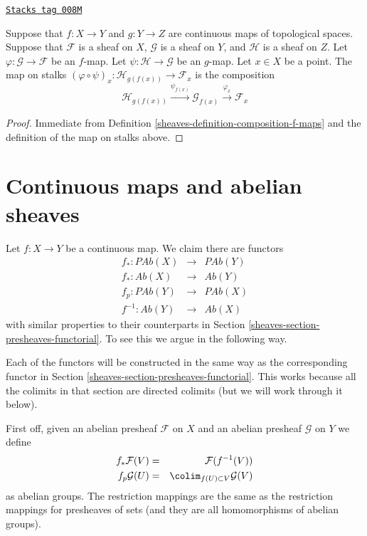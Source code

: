 \begin{lemma}
\label{sheaves-lemma-compose-f-maps-stalks}
\href{https://stacks.math.columbia.edu/tag/008M}{\texttt{Stacks tag 008M}}

Suppose that $f : X \to Y$ and $g : Y \to Z$ are continuous
maps of topological spaces. Suppose that $\mathcal{F}$ is
a sheaf on $X$, $\mathcal{G}$ is a sheaf on $Y$, and
$\mathcal{H}$ is a sheaf on $Z$.
Let $\varphi : \mathcal{G} \to \mathcal{F}$ be an $f$-map.
Let $\psi : \mathcal{H} \to \mathcal{G}$ be an $g$-map.
Let $x \in X$ be a point. The map on stalks
$(\varphi \circ \psi)_x : \mathcal{H}_{g(f(x))}
\to \mathcal{F}_x$ is the composition
$$
\mathcal{H}_{g(f(x))}
\xrightarrow{\psi_{f(x)}}
\mathcal{G}_{f(x)}
\xrightarrow{\varphi_x}
\mathcal{F}_x
$$
\end{lemma}

\begin{proof}

Immediate from Definition \ref{sheaves-definition-composition-f-maps}
and the definition of the map on stalks above.
\end{proof}

\section{Continuous maps and abelian sheaves}
\label{sheaves-section-abelian-presheaves-functorial}
Let $f : X \to Y$ be a continuous map.
We claim there are functors
\begin{eqnarray*}
f_* : \textit{PAb}(X) & \longrightarrow & \textit{PAb}(Y) \\
f_* : \textit{Ab}(X) & \longrightarrow & \textit{Ab}(Y) \\
f_p : \textit{PAb}(Y) & \longrightarrow & \textit{PAb}(X) \\
f^{-1} : \textit{Ab}(Y) & \longrightarrow & \textit{Ab}(X)
\end{eqnarray*}
with similar properties to their counterparts in
Section \ref{sheaves-section-presheaves-functorial}.
To see this we argue in the following way.

\medskip\noindent
Each of the functors will be constructed in the same
way as the corresponding functor in
Section \ref{sheaves-section-presheaves-functorial}.
This works because all the colimits in that section
are directed colimits (but we will work through it below).

\medskip\noindent
First off, given an abelian presheaf $\mathcal{F}$ on $X$ and
an abelian presheaf $\mathcal{G}$ on $Y$ we define
\begin{eqnarray*}
f_*\mathcal{F}(V) & = & \mathcal{F}(f^{-1}(V)) \\
f_p\mathcal{G}(U) & = & \colim_{f(U) \subset V} \mathcal{G}(V)
\end{eqnarray*}
as abelian groups. The restriction mappings are the same as
the restriction mappings for presheaves of sets (and they are
all homomorphisms of abelian groups).

